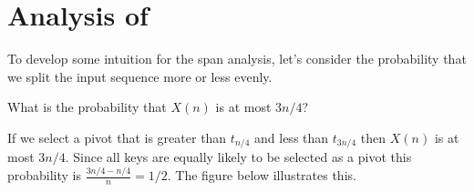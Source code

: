 {%


\section*{Analysis of \Qsort{}}

To develop some intuition for the span analysis, let's consider the
probability that we split the input sequence more or less evenly.
%
\begin{question}
What is the probability that $X(n)$ is at most $3n/4$? 
\end{question}
%
If we select a pivot that is greater than $t_{n/4}$ and less than
$t_{3n/4}$ then $X(n)$ is at most $3n/4$.  Since all keys are equally
  likely to be selected as a pivot this probability is $\frac{3n/4 - n/4}{n} =
  1/2$.  The figure below illustrates this.

}
